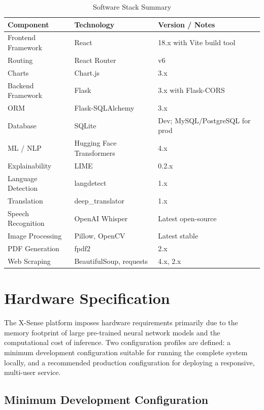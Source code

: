 \documentclass[12pt, a4paper]{report}
\begin{document}
\begin{table}[H]
\centering
\caption{Software Stack Summary}
\label{tab:software-stack}
\small
\begin{tabularx}{\textwidth}{|l|l|X|}
\hline
\textbf{Component} & \textbf{Technology} & \textbf{Version / Notes} \\
\hline
Frontend Framework & React & 18.x with Vite build tool \\
\hline
Routing & React Router & v6 \\
\hline
Charts & Chart.js & 3.x \\
\hline
Backend Framework & Flask & 3.x with Flask-CORS \\
\hline
ORM & Flask-SQLAlchemy & 3.x \\
\hline
Database & SQLite & Dev; MySQL/PostgreSQL for prod \\
\hline
ML / NLP & Hugging Face Transformers & 4.x \\
\hline
Explainability & LIME & 0.2.x \\
\hline
Language Detection & langdetect & 1.x \\
\hline
Translation & deep\_translator & 1.x \\
\hline
Speech Recognition & OpenAI Whisper & Latest open-source \\
\hline
Image Processing & Pillow, OpenCV & Latest stable \\
\hline
PDF Generation & fpdf2 & 2.x \\
\hline
Web Scraping & BeautifulSoup, requests & 4.x, 2.x \\
\hline
\end{tabularx}
\end{table}

\section{Hardware Specification}

The X-Sense platform imposes hardware requirements primarily due to the memory footprint of large pre-trained neural network models and the computational cost of inference. Two configuration profiles are defined: a minimum development configuration suitable for running the complete system locally, and a recommended production configuration for deploying a responsive, multi-user service.

\subsection{Minimum Development Configuration}
\end{document}
